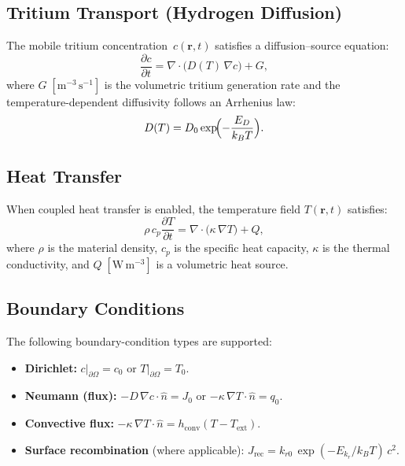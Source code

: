 \documentclass[11pt,a4paper]{article}
\begin{document}
\subsection{Tritium Transport (Hydrogen Diffusion)}

The mobile tritium concentration~$c(\mathbf{r}, t)$ satisfies a
diffusion--source equation:
\begin{equation}
  \frac{\partial c}{\partial t}
  = \nabla \cdot \bigl( D(T)\,\nabla c \bigr) + G,
  \label{eq:diffusion}
\end{equation}
where $G\;\mathrm{[m^{-3}\,s^{-1}]}$ is the volumetric tritium generation
rate and the temperature-dependent diffusivity follows an Arrhenius law:
\begin{equation}
  D(T) = D_0 \exp\!\Bigl(-\frac{E_D}{k_B T}\Bigr).
  \label{eq:arrhenius}
\end{equation}

\subsection{Heat Transfer}

When coupled heat transfer is enabled, the temperature field
$T(\mathbf{r},t)$ satisfies:
\begin{equation}
  \rho \, c_p \frac{\partial T}{\partial t}
  = \nabla \cdot \bigl(\kappa \,\nabla T\bigr) + Q,
  \label{eq:heat}
\end{equation}
where $\rho$ is the material density, $c_p$ is the specific heat capacity,
$\kappa$ is the thermal conductivity, and
$Q\;\mathrm{[W\,m^{-3}]}$ is a volumetric heat source.

\subsection{Boundary Conditions}

The following boundary-condition types are supported:
\begin{itemize}[nosep]
  \item \textbf{Dirichlet:} $c\big|_{\partial\Omega} = c_0$ \; or \;
        $T\big|_{\partial\Omega} = T_0$.
  \item \textbf{Neumann (flux):} $-D\,\nabla c \cdot \hat{n} = J_0$ \; or \;
        $-\kappa\,\nabla T \cdot \hat{n} = q_0$.
  \item \textbf{Convective flux:}
        $-\kappa\,\nabla T \cdot \hat{n} = h_\mathrm{conv}(T - T_\mathrm{ext})$.
  \item \textbf{Surface recombination} (where applicable):
        $J_\mathrm{rec} = k_{r0}\,\exp(-E_{k_r}/k_B T)\,c^2$.
\end{itemize}
\end{document}
